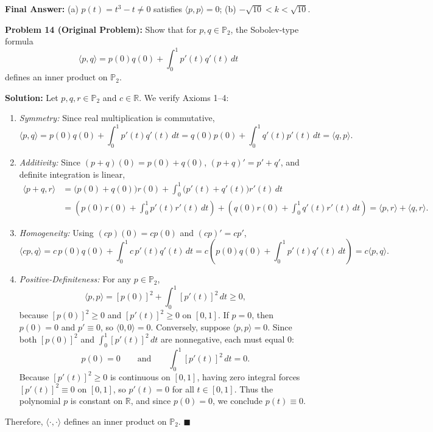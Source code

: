 \documentclass[11pt, letterpaper]{article}
\theoremstyle{definition}
\theoremstyle{remark}
\begin{document}
\textbf{Final Answer:} (a) $p(t) = t^3 - t \neq 0$ satisfies $\langle p, p \rangle = 0$; (b) $-\sqrt{10} < k < \sqrt{10}$.

\medskip

\textbf{Problem 14 (Original Problem):} Show that for $p, q \in \mathbb{P}_2$, the Sobolev-type formula
\[
\langle p, q \rangle = p(0)q(0) + \int_0^1 p'(t)q'(t)\,dt
\]
defines an inner product on $\mathbb{P}_2$.

\textbf{Solution:} Let $p, q, r \in \mathbb{P}_2$ and $c \in \mathbb{R}$. We verify Axioms 1--4:
\begin{enumerate}
    \item \emph{Symmetry:} Since real multiplication is commutative,
    \[
    \langle p, q \rangle = p(0)q(0) + \int_0^1 p'(t)q'(t)\,dt = q(0)p(0) + \int_0^1 q'(t)p'(t)\,dt = \langle q, p \rangle.
    \]
    \item \emph{Additivity:} Since $(p+q)(0) = p(0)+q(0)$, $(p+q)' = p'+q'$, and definite integration is linear,
    \begin{align*}
    \langle p + q, r \rangle &= \big(p(0) + q(0)\big)r(0) + \int_0^1 \big(p'(t) + q'(t)\big)r'(t)\,dt \\
    &= \left(p(0)r(0) + \int_0^1 p'(t)r'(t)\,dt\right) + \left(q(0)r(0) + \int_0^1 q'(t)r'(t)\,dt\right) = \langle p, r \rangle + \langle q, r \rangle.
    \end{align*}
    \item \emph{Homogeneity:} Using $(cp)(0) = cp(0)$ and $(cp)' = cp'$,
    \[
    \langle cp, q \rangle = c\,p(0)q(0) + \int_0^1 c\,p'(t)q'(t)\,dt = c\left(p(0)q(0) + \int_0^1 p'(t)q'(t)\,dt\right) = c\langle p, q \rangle.
    \]
    \item \emph{Positive-Definiteness:} For any $p \in \mathbb{P}_2$,
    \[
    \langle p, p \rangle = [p(0)]^2 + \int_0^1 [p'(t)]^2\,dt \ge 0,
    \]
    because $[p(0)]^2 \ge 0$ and $[p'(t)]^2 \ge 0$ on $[0, 1]$. If $p = 0$, then $p(0) = 0$ and $p' \equiv 0$, so $\langle 0, 0 \rangle = 0$. Conversely, suppose $\langle p, p \rangle = 0$. Since both $[p(0)]^2$ and $\int_0^1 [p'(t)]^2\,dt$ are nonnegative, each must equal $0$:
    \[
    p(0) = 0 \qquad \text{and} \qquad \int_0^1 [p'(t)]^2\,dt = 0.
    \]
    Because $[p'(t)]^2 \ge 0$ is continuous on $[0, 1]$, having zero integral forces $[p'(t)]^2 \equiv 0$ on $[0, 1]$, so $p'(t) = 0$ for all $t \in [0, 1]$. Thus the polynomial $p$ is constant on $\mathbb{R}$, and since $p(0) = 0$, we conclude $p(t) \equiv 0$.
\end{enumerate}
Therefore, $\langle \cdot, \cdot \rangle$ defines an inner product on $\mathbb{P}_2$. $\blacksquare$
\end{document}
